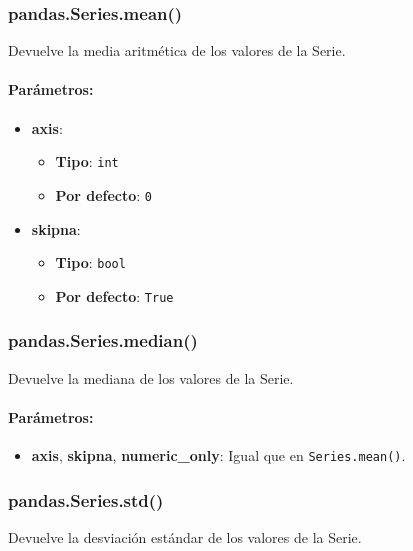     \subsubsection{pandas.Series.mean()} Devuelve la media aritmética de los valores de la Serie.

    \paragraph{Parámetros:}
    \begin{itemize}
        \item \textbf{axis}:
            \begin{itemize}
                \item \textbf{Tipo}: \texttt{int}
                \item \textbf{Por defecto}: \texttt{0}
            \end{itemize}
        \item \textbf{skipna}:
            \begin{itemize}
                \item \textbf{Tipo}: \texttt{bool}
                \item \textbf{Por defecto}: \texttt{True}
            \end{itemize}
    \end{itemize}

    \subsubsection{pandas.Series.median()} Devuelve la mediana de los valores de la Serie.

    \paragraph{Parámetros:}
    \begin{itemize}
        \item \textbf{axis}, \textbf{skipna}, \textbf{numeric\_only}: Igual que en \texttt{Series.mean()}.
    \end{itemize}

    \subsubsection{pandas.Series.std()} Devuelve la desviación estándar de los valores de la Serie.

